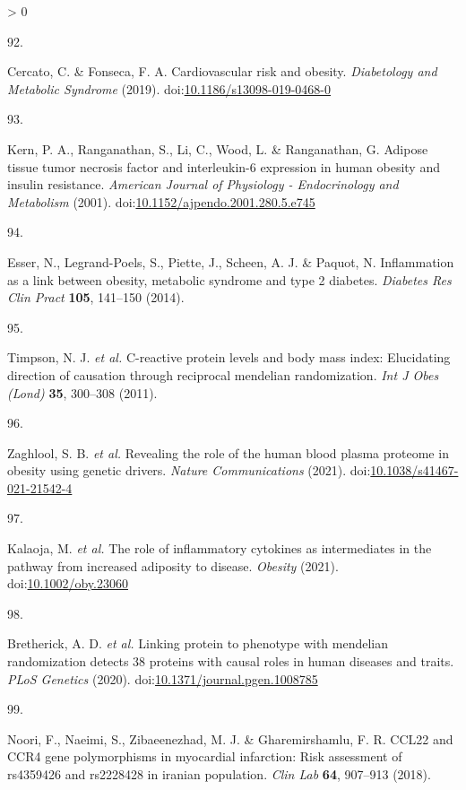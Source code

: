 \documentclass[11pt,twoside]{bristolthesis}
\newlength{\cslhangindent}
\newlength{\csllabelwidth}
\newenvironment{CSLReferences}[2] %
 {%
  \setlength{\parindent}{0pt}
  \ifodd #1 \everypar{\setlength{\hangindent}{\cslhangindent}}\ignorespaces\fi
  \ifnum #2 > 0
  \setlength{\parskip}{#2\baselineskip}
  \fi
 }%
 {}
\newcommand{\CSLLeftMargin}[1]{\parbox[t]{\csllabelwidth}{#1}}
\newcommand{\CSLRightInline}[1]{\parbox[t]{\linewidth - \csllabelwidth}{#1}\break}
\begin{document}
\begin{CSLReferences}{0}{0}
\leavevmode\hypertarget{ref-Cercato2019}{}%
\CSLLeftMargin{92. }
\CSLRightInline{Cercato, C. \& Fonseca, F. A. Cardiovascular risk and obesity. \emph{Diabetology and Metabolic Syndrome} (2019). doi:\href{https://doi.org/10.1186/s13098-019-0468-0}{10.1186/s13098-019-0468-0}}

\leavevmode\hypertarget{ref-Kern2001}{}%
\CSLLeftMargin{93. }
\CSLRightInline{Kern, P. A., Ranganathan, S., Li, C., Wood, L. \& Ranganathan, G. Adipose tissue tumor necrosis factor and interleukin-6 expression in human obesity and insulin resistance. \emph{American Journal of Physiology - Endocrinology and Metabolism} (2001). doi:\href{https://doi.org/10.1152/ajpendo.2001.280.5.e745}{10.1152/ajpendo.2001.280.5.e745}}

\leavevmode\hypertarget{ref-Esser2014}{}%
\CSLLeftMargin{94. }
\CSLRightInline{Esser, N., Legrand-Poels, S., Piette, J., Scheen, A. J. \& Paquot, N. Inflammation as a link between obesity, metabolic syndrome and type 2 diabetes. \emph{Diabetes Res Clin Pract} \textbf{105}, 141--150 (2014).}

\leavevmode\hypertarget{ref-Timpson2011}{}%
\CSLLeftMargin{95. }
\CSLRightInline{Timpson, N. J. \emph{et al.} C-reactive protein levels and body mass index: Elucidating direction of causation through reciprocal mendelian randomization. \emph{Int J Obes (Lond)} \textbf{35}, 300--308 (2011).}

\leavevmode\hypertarget{ref-Zaghlool2021}{}%
\CSLLeftMargin{96. }
\CSLRightInline{Zaghlool, S. B. \emph{et al.} Revealing the role of the human blood plasma proteome in obesity using genetic drivers. \emph{Nature Communications} (2021). doi:\href{https://doi.org/10.1038/s41467-021-21542-4}{10.1038/s41467-021-21542-4}}

\leavevmode\hypertarget{ref-Kalaoja2021}{}%
\CSLLeftMargin{97. }
\CSLRightInline{Kalaoja, M. \emph{et al.} The role of inflammatory cytokines as intermediates in the pathway from increased adiposity to disease. \emph{Obesity} (2021). doi:\href{https://doi.org/10.1002/oby.23060}{10.1002/oby.23060}}

\leavevmode\hypertarget{ref-Bretherick2020}{}%
\CSLLeftMargin{98. }
\CSLRightInline{Bretherick, A. D. \emph{et al.} Linking protein to phenotype with mendelian randomization detects 38 proteins with causal roles in human diseases and traits. \emph{PLoS Genetics} (2020). doi:\href{https://doi.org/10.1371/journal.pgen.1008785}{10.1371/journal.pgen.1008785}}

\leavevmode\hypertarget{ref-Noori2018}{}%
\CSLLeftMargin{99. }
\CSLRightInline{Noori, F., Naeimi, S., Zibaeenezhad, M. J. \& Gharemirshamlu, F. R. CCL22 and CCR4 gene polymorphisms in myocardial infarction: Risk assessment of rs4359426 and rs2228428 in iranian population. \emph{Clin Lab} \textbf{64}, 907--913 (2018).}


\end{CSLReferences}
\end{document}
